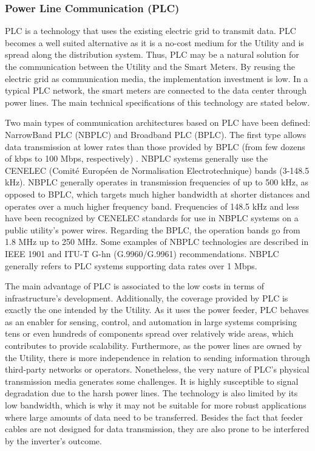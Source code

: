 \documentclass[11pt,draftclsnofoot,onecolumn]{IEEEtran}
\begin{document}
\subsubsection{Power Line Communication (PLC)}\label{tech::plc}

PLC is a technology that uses the existing electric grid to transmit data. PLC becomes a well suited alternative as it is a no-cost medium for the Utility and is spread along the distribution system. Thus, PLC may be a natural solution for the communication between the Utility and the Smart Meters. By reusing the electric grid as communication media, the implementation investment is low. In a typical PLC network, the smart meters are connected to the data center through power lines. The main technical specifications of this technology are stated below.

Two main types of communication architectures based on PLC have been defined: NarrowBand PLC (NBPLC) and Broadband PLC (BPLC). The first type allows data transmission at lower rates than those provided by BPLC (from few dozens of kbps to 100 Mbps, respectively) \cite{Sabbah2014}. NBPLC systems generally use the CENELEC (Comit\'{e} Europ\'{e}en de Normalisation Electrotechnique) bands (3-148.5 kHz). NBPLC generally operates in transmission frequencies of up to 500 kHz, as opposed to BPLC, which targets much higher bandwidth at shorter distances and operates over a much higher frequency band. Frequencies of 148.5 kHz and less have been recognized by CENELEC standards for use in NBPLC systems on a public utility's power wires. Regarding the BPLC, the operation bands go from 1.8 MHz up to 250 MHz. Some examples of NBPLC technologies are described in IEEE 1901 and ITU-T G-hn (G.9960/G.9961) recommendations. NBPLC generally refers to PLC systems supporting data rates over 1 Mbps.

The main advantage of PLC is associated to the low costs in terms of infrastructure's development. Additionally, the coverage provided by PLC is exactly the one intended by the Utility. As it uses the power feeder, PLC behaves as an enabler for sensing, control, and automation in large systems comprising tens or even hundreds of components spread over relatively wide areas, which contributes to provide scalability. Furthermore, as the power lines are owned by the Utility, there is more independence in relation to sending information through third-party networks or operators. Nonetheless, the very nature of  PLC's physical transmission media generates some challenges. It is highly susceptible to signal degradation due to the harsh power lines. The technology is also limited by its low bandwidth, which is why it may not be suitable for more robust applications where large amounts of data need to be transferred. Besides the fact that feeder cables are not designed for data transmission, they are also prone to be interfered by the inverter’s outcome. %
\end{document}
